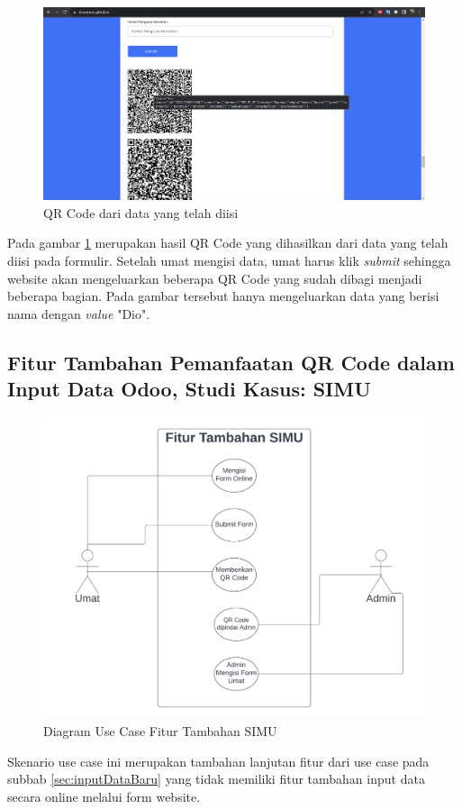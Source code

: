 \begin{figure}[H]
	\centering
	\includegraphics[scale=0.4]{Gambar/qrCodeSubmit.png}
	\caption{QR Code dari data yang telah diisi} 
	\label{fig:qrCodeSubmit}
\end{figure}

Pada gambar \ref{fig:qrCodeSubmit} merupakan hasil QR Code yang dihasilkan dari data yang telah diisi pada formulir. Setelah umat mengisi data, umat harus klik \textit{submit} sehingga website akan mengeluarkan beberapa QR Code yang sudah dibagi menjadi beberapa bagian. Pada gambar tersebut hanya mengeluarkan data yang berisi nama dengan \textit{value} "Dio". 

\subsection{Fitur Tambahan Pemanfaatan QR Code dalam Input Data Odoo, Studi Kasus: SIMU}
\label{sec:fiturTambahan}

\begin{figure}[H]
	\centering
	\includegraphics[scale=0.7]{Gambar/fiturTambahan.png}
	\caption{Diagram Use Case Fitur Tambahan SIMU} 
	\label{fig:fiturTambahan}
\end{figure}

Skenario use case ini merupakan tambahan lanjutan fitur dari use case pada subbab \ref{sec:inputDataBaru} yang tidak memiliki fitur tambahan input data secara online melalui form website.